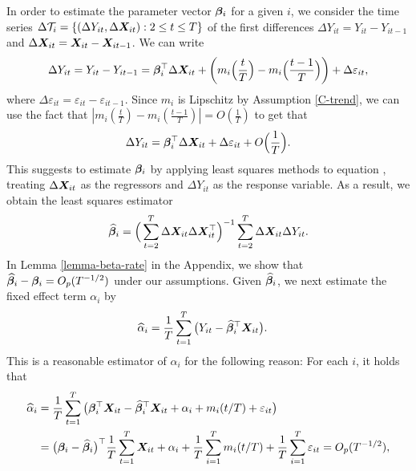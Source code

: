 \documentclass[a4paper,12pt]{article}
\makeatletter
\renewcommand{\eqref}[1]{\tagform@{\ref{#1}}}
\makeatother
\begin{document}
In order to estimate the parameter vector $\bm{\beta}_i$ for a given $i$, we consider the time series $\Delta \mathcal{T}_i = \{(\Delta Y_{it}, \Delta \boldsymbol{X}_{it}): 2 \leq t \leq T\}$ of the first differences $\Delta Y_{it} = Y_{it} - Y_{i t-1}$ and $\Delta  \boldsymbol{X}_{it} =  \boldsymbol{X}_{it} - \boldsymbol{X}_{it-1}$. We can write
\begin{align*}
\Delta Y_{it} = Y_{it} - Y_{i t-1} =\bm{\beta}_i^\top \Delta \boldsymbol{X}_{it} + \bigg(m_i \Big( \frac{t}{T} \Big) - m_i \Big(\frac{t-1}{T}\Big)\bigg) + \Delta \varepsilon_{it},
\end{align*}
where $ \Delta \varepsilon_{it} = \varepsilon_{it} - \varepsilon_{i t-1}$. Since $m_i$ is Lipschitz by Assumption \ref{C-trend}, we can use the fact that $ |m_i ( \frac{t}{T} ) - m_i (\frac{t-1}{T}) | = O(\frac{1}{T})$ to get that 
\begin{align}\label{model_with_regs}
	\Delta Y_{it} = \bm{\beta}_i^\top \Delta \boldsymbol{X}_{it} + \Delta \varepsilon_{it} + O\Big(\frac{1}{T}\Big).
\end{align}
This suggests to estimate $\bm{\beta}_i$ by applying least squares methods to equation \eqref{model_with_regs}, treating $\Delta \boldsymbol{X}_{it}$ as the regressors and $\Delta Y_{it}$ as the response variable. As a result, we obtain the least squares estimator
\begin{align}\label{eq:beta:est}
\widehat{\bm{\beta}}_i = \Big( \sum_{t=2}^T \Delta \boldsymbol{X}_{it} \Delta \boldsymbol{X}_{it}^\top \Big)^{-1} \sum_{t=2}^T \Delta \boldsymbol{X}_{it} \Delta Y_{it}.
\end{align}
In Lemma \ref{lemma-beta-rate} in the Appendix, we show that $\widehat{\bm{\beta}}_i - \bm{\beta}_i = O_p(T^{-1/2})$ under our assumptions. 
Given $\widehat{\bm{\beta}}_i$, we next estimate the fixed effect term $\alpha_i$ by 
\begin{align}\label{eq:alpha:est}
\widehat{\alpha}_i &= \frac{1}{T}\sum_{t=1}^T \big(Y_{it} - \widehat{\bm{\beta}}_i^\top \boldsymbol{X}_{it}\big). 
\end{align}
This is a reasonable estimator of $\alpha_i$ for the following reason: For each $i$, it holds that
\begin{align*}
\widehat{\alpha}_i &= \frac{1}{T}\sum_{t=1}^T \big(\bfbeta_i^\top \X_{it} - \widehat{\bfbeta}_i^\top \X_{it} + \alpha_i + m_i(t/T) + \varepsilon_{it}\big) \nonumber \\
&= \big(\bfbeta_i - \widehat{\bfbeta}_i \big)^\top\frac{1}{T}\sum_{t=1}^T  \X_{it} + \alpha_i + \frac{1}{T}\sum_{i=1}^T m_i(t/T) + \frac{1}{T}\sum_{i=1}^T \varepsilon_{it} = O_p(T^{-1/2}), %
\end{align*}
\end{document}
